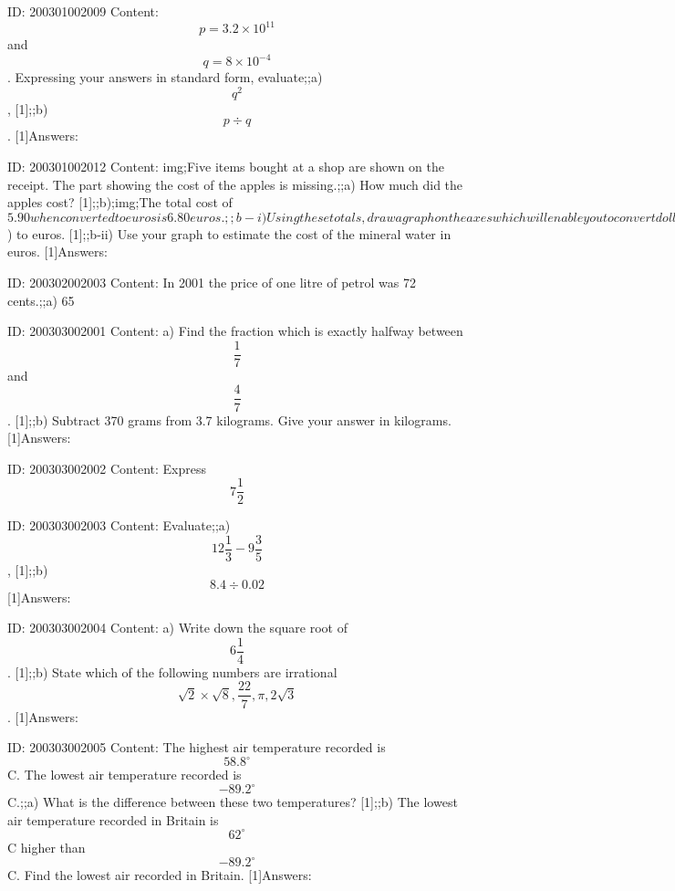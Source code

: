 \documentclass{article}
\begin{document}
ID: 200301002009
Content:
$$p=3.2 \times 10^{11}$$ and $$q=8 \times 10^{-4}$$. Expressing your answers in standard form, evaluate;;a) $$q^{2} $$, [1];;b) $$p\div q$$. [1]Answers:

ID: 200301002012
Content:
img;Five items bought at a shop are shown on the receipt. The part showing the cost of the apples is missing.;;a) How much did the apples cost? [1];;b);img;The total cost of $5.90 when converted to euros is 6.80 euros.;;b-i) Using these totals, draw a graph on the axes which will enable you to convert dollars ($) to euros. [1];;b-ii) Use your graph to estimate the cost of the mineral water in euros. [1]Answers:

ID: 200302002003
Content:
In 2001 the price of one litre of petrol was 72 cents.;;a) 65%

ID: 200303002001
Content:
a) Find the fraction which is exactly halfway between $$\frac{1}{7}$$ and $$\frac{4}{7}$$.   [1];;b) Subtract 370 grams from 3.7 kilograms. Give your answer in kilograms.   [1]Answers:

ID: 200303002002
Content:
Express $$7 \frac{1}{2}$$%

ID: 200303002003
Content:
Evaluate;;a) $$12 \frac{1}{3} - 9 \frac{3}{5}$$,   [1];;b) $$8.4 \div 0.02$$ [1]Answers:

ID: 200303002004
Content:
a) Write down the square root of $$6 \frac{1}{4}$$.   [1];;b) State which of the following numbers are irrational $$\sqrt{2} \times \sqrt{8}, \frac{22}{7}, \pi, 2\sqrt{3}$$. [1]Answers:

ID: 200303002005
Content:
The highest air temperature recorded is $$58.8^{\circ}$$C. The lowest air temperature recorded is $$-89.2^{\circ}$$C.;;a) What is the difference between these two temperatures?   [1];;b) The lowest air temperature recorded in Britain is $$62^{\circ}$$C higher than $$-89.2^{\circ}$$C. Find the lowest air recorded in Britain.   [1]Answers:
\end{document}

